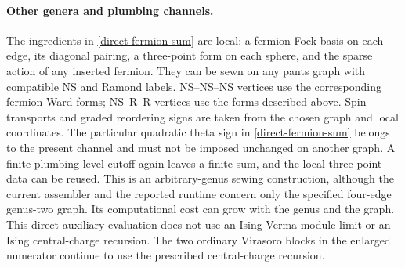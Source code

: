 \paragraph{Other genera and plumbing channels.}
The ingredients in \eqref{direct-fermion-sum} are local: a fermion
Fock basis on each edge, its diagonal pairing, a three-point form on
each sphere, and the sparse action of any inserted fermion.  They can
be sewn on any pants graph with compatible NS and Ramond labels.
NS--NS--NS vertices use the corresponding fermion Ward forms;
NS--R--R vertices use the forms described above.  Spin transports
and graded reordering signs are taken from the chosen graph and
local coordinates.  The particular quadratic theta sign in
\eqref{direct-fermion-sum} belongs to the present channel and must
not be imposed unchanged on another graph.  A finite plumbing-level
cutoff again leaves a finite sum, and the local three-point data can
be reused.  This is an arbitrary-genus sewing construction, although
the current assembler and the reported runtime concern only the
specified four-edge genus-two graph.  Its computational cost can
grow with the genus and the graph.  This direct auxiliary evaluation
does not use an Ising Verma-module limit or an Ising central-charge
recursion.  The two ordinary Virasoro blocks in the enlarged numerator
continue to use the prescribed central-charge recursion.
